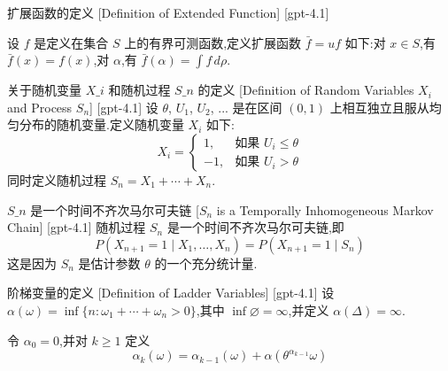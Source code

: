 \documentclass[UTF8]{ctexart}
\begin{document}
    
    
    \begin{dfn}
        {扩展函数的定义}
        [Definition of Extended Function]
        [gpt-4.1]
        
设 $f$ 是定义在集合 $S$ 上的有界可测函数,定义扩展函数 $\bar{f} = 
u f$ 如下:对 $x \in S$,有 $\bar{f}(x) = f(x)$,对 $\alpha$,有 $\bar{f}(\alpha) = \int f\, d\rho$.

    \end{dfn}
    
    
    
    \begin{dfn}
        {关于随机变量 $X\_i$ 和随机过程 $S\_n$ 的定义}
        [Definition of Random Variables $X_i$ and Process $S_n$]
        [gpt-4.1]
        设 $\theta$, $U_{1}$, $U_{2}$, ... 是在区间 $(0, 1)$ 上相互独立且服从均匀分布的随机变量.定义随机变量 $X_{i}$ 如下:
\[
X_{i} =
\begin{cases}
1, & \text{如果 } U_{i} \le \theta \\
-1, & \text{如果 } U_{i} > \theta
\end{cases}
\]
同时定义随机过程 $S_{n} = X_{1} + \cdots + X_{n}$.

    \end{dfn}
    
    
    
    \begin{ppt}
        {$S\_n$ 是一个时间不齐次马尔可夫链}
        [$S_n$ is a Temporally Inhomogeneous Markov Chain]
        [gpt-4.1]
        随机过程 $S_n$ 是一个时间不齐次马尔可夫链,即
\[
P(X_{n+1} = 1 \mid X_{1}, \ldots, X_{n}) = P(X_{n+1} = 1 \mid S_n)
\]
这是因为 $S_{n}$ 是估计参数 $\theta$ 的一个充分统计量.

    \end{ppt}
    
    
    
    \begin{dfn}
        {阶梯变量的定义}
        [Definition of Ladder Variables]
        [gpt-4.1]
        设 $\alpha(\omega) = \inf\{ n : \omega_{1} + \cdots + \omega_{n} > 0 \}$,其中 $\inf \varnothing = \infty$,并定义 $\alpha(\Delta) = \infty$.

令 $\alpha_{0} = 0$,并对 $k \geq 1$ 定义
\[
\alpha_{k}(\omega) = \alpha_{k-1}(\omega) + \alpha(\theta^{\alpha_{k-1}} \omega)
\]

    \end{dfn}
    
\end{document}
